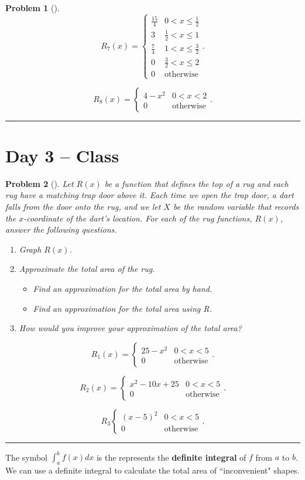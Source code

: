 \documentclass[letterpaper,oneside]{book}%
\theoremstyle{plain}
\theoremstyle{box}
\theoremstyle{problem}
\newtheorem{problemnum}{Problem}[chapter]
\newenvironment{problem}[1][]{\begin{problemnum}[#1]}{\end{problemnum}\nopagebreak\hrule\bigskip}
\begin{document}
\begin{problem}
$$R_7(x) = 
    \begin{cases}
    \frac{15}{4} & 0 < x \leq \frac{1}{2} \\
    3 & \frac{1}{2} < x \leq 1 \\
    \frac{7}{4} & 1 < x \leq \frac{3}{2} \\
    0 & \frac{3}{2} < x \leq 2 \\
    0 & \text{otherwise}
    \end{cases}.$$

$$R_8(x) = 
    \begin{cases}
    4-x^2 & 0 < x < 2 \\
    0 & \text{otherwise}
    \end{cases}.$$
\end{problem}



\section{Day 3 -- Class}
\begin{problem}
\label{D3_ApproxArea}
Let $R(x)$ be a function that defines the top of a rug and each rug have a matching trap door above it. Each time we open the trap door, a dart falls from the door onto the rug, and we let $X$ be the random variable that records the $x$-coordinate of the dart's location. For each of the rug functions, $R(x)$, answer the following questions.
\begin{enumerate}
\item Graph $R(x)$.
\item Approximate the total area of the rug. 
  \begin{itemize}
  \item Find an approximation for the total area by hand. %
  \item Find an approximation for the total area using R. %
  \end{itemize}
\item How would you improve your approximation of the total area?
\end{enumerate}
$$R_1(x) = 
    \begin{cases}
    25-x^2 & 0 < x < 5 \\
    0 & \text{otherwise}
    \end{cases}.$$

$$R_2(x) = 
    \begin{cases}
    x^2 - 10x + 25 & 0 < x < 5 \\
    0 & \text{otherwise}
    \end{cases}.$$

$$R_3
    \begin{cases}
    (x-5)^2 & 0 < x < 5 \\
    0 & \text{otherwise}
    \end{cases}.$$
\end{problem}
The symbol $\int_a^b f(x)dx$ is the represents the \textbf{definite integral} of $f$ from $a$ to $b$. We can use a definite integral to calculate the total area of ``inconvenient" shapes.
\end{document}
